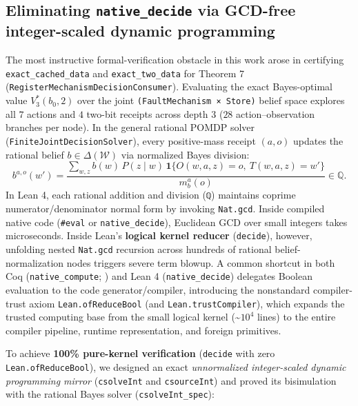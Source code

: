 \documentclass[11pt,a4paper]{article}
\begin{document}
\subsection{\texorpdfstring{Eliminating \texttt{native\_decide} via
GCD-free integer-scaled dynamic
programming}{Eliminating native\_decide via GCD-free integer-scaled dynamic programming}}\label{eliminating-native_decide-via-gcd-free-integer-scaled-dynamic-programming}

The most instructive formal-verification obstacle in this work arose in
certifying \texttt{exact\_cached\_data} and \texttt{exact\_two\_data}
for Theorem 7 (\texttt{RegisterMechanismDecisionConsumer}). Evaluating
the exact Bayes-optimal value \(V_3^*(b_0, 2)\) over the joint
\texttt{(FaultMechanism\ ×\ Store)} belief space explores all \(7\)
actions and \(4\) two-bit receipts across depth \(3\) (\(28\)
action--observation branches per node). In the general rational POMDP
solver (\texttt{FiniteJointDecisionSolver}), every positive-mass receipt
\((a, o)\) updates the rational belief \(b \in \Delta(\mathcal{W})\) via
normalized Bayes division:
\[b^{a,o}(w') = \frac{\sum_{w,z} b(w)\, P(z \mid w)\, \mathbf{1}\{O(w,a,z)=o,\ T(w,a,z)=w'\}}{m_b^a(o)} \in \mathbb{Q}.\]
In Lean 4, each rational addition and division (\texttt{ℚ}) maintains
coprime numerator/denominator normal form by invoking \texttt{Nat.gcd}.
Inside compiled native code (\texttt{\#eval} or
\texttt{native\_decide}), Euclidean GCD over small integers takes
microseconds. Inside Lean's \textbf{logical kernel reducer}
(\texttt{decide}), however, unfolding nested \texttt{Nat.gcd} recursion
across hundreds of rational belief-normalization nodes triggers severe
term blowup. A common shortcut in both Coq (\texttt{native\_compute};
\citet{boespflug2011}) and Lean 4 (\texttt{native\_decide}) delegates
Boolean evaluation to the code generator/compiler, introducing the
nonstandard compiler-trust axiom \texttt{Lean.ofReduceBool} (and
\texttt{Lean.trustCompiler}), which expands the trusted computing base
from the small logical kernel (\textasciitilde{}\(10^4\) lines) to the
entire compiler pipeline, runtime representation, and foreign
primitives.

To achieve \textbf{100\% pure-kernel verification} (\texttt{decide} with
zero \texttt{Lean.ofReduceBool}), we designed an exact
\emph{unnormalized integer-scaled dynamic programming mirror}
(\texttt{csolveInt} and \texttt{csourceInt}) and proved its bisimulation
with the rational Bayes solver (\texttt{csolveInt\_spec}):
\end{document}

